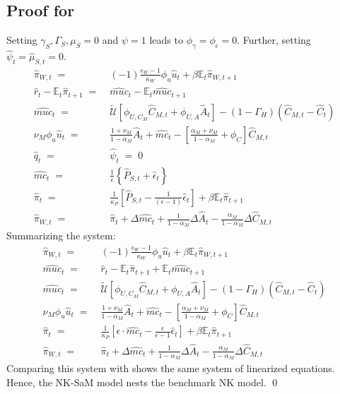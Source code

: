 \documentclass[12pt,3p,authoryear,review]{elsarticle}
\begin{document}
\subsection{Proof for }\label{proof:no_sam}%
\begin{small}%
    \noindent Setting $\gamma_S, \Gamma_S, \mu_S=0$ and $\psi = 1$ leads to $\phi_\gamma=\phi_\epsilon=0$. Further, setting $\hat{\psi}_t = \hat{\mu}_{S,t} = 0$.%
    \begin{align}%
        \hat{\pi}_{W,t} \; = & \; (-1)\frac{\epsilon_W-1}{\kappa_W} \phi_u \hat{u}_t + \beta \mathbb{E}_t \hat{\pi}_{W,t+1}\\%
        \hat{r}_t - \mathbb{E}_t \hat{\pi}_{t+1} \; = & \; \hat{muc}_t - \mathbb{E}_t \hat{muc}_{t+1}\\%
        \hat{muc}_t \; = & \; \tilde{\mathcal{U}} \left[ \phi_{U,C_M} \hat{C}_{M,t} + \phi_{U,A} \hat{A}_t \right] - \left(1-\Gamma_H\right)\left(\hat{C}_{M,t}-\hat{C}_t\right)\\%
        \nu_M \phi_u \hat{u}_t \; = & \; \frac{1+\nu_M}{1-\alpha_M} \hat{A}_t + \hat{mc}_t - \left[\frac{\alpha_M+\nu_M}{1-\alpha_M}+\phi_C\right] \hat{C}_{M,t}\\%
        \hat{q}_t \; = & \; \hat{\psi}_t \; = \; 0\\%
        \hat{mc}_t \; = & \; \frac{1}{\epsilon} \left\{ \hat{P}_{S,t} + \hat{\epsilon}_t \right\}\\%
        \hat{\pi}_t \; = & \; \frac{1}{\kappa_P} \left[ \hat{P}_{S,t} - \frac{1}{\left(\epsilon-1\right)} \hat{\epsilon}_t \right] + \beta \mathbb{E}_t \hat{\pi}_{t+1}\\%
        \hat{\pi}_{W,t} \; = & \; \hat{\pi}_t + \Delta\hat{mc}_t + \frac{1}{1-\alpha_M} \Delta \hat{A}_t - \frac{\alpha_M}{1-\alpha_M}\Delta\hat{C}_{M,t}%
    \end{align}%
    Summarizing the system:%
    \begin{align}%
        \hat{\pi}_{W,t} \; = & \; (-1)\frac{\epsilon_W-1}{\kappa_W} \phi_u \hat{u}_t + \beta \mathbb{E}_t \hat{\pi}_{W,t+1}\\%
        \hat{muc}_t \; = & \; \hat{r}_t - \mathbb{E}_t \hat{\pi}_{t+1} + \mathbb{E}_t \hat{muc}_{t+1}\\%
        \hat{muc}_t \; = & \; \tilde{\mathcal{U}} \left[ \phi_{U,C_M} \hat{C}_{M,t} + \phi_{U,A} \hat{A}_t \right] - \left(1-\Gamma_H\right)\left(\hat{C}_{M,t}-\hat{C}_t\right)\\%
        \nu_M \phi_u \hat{u}_t \; = & \; \frac{1+\nu_M}{1-\alpha_M} \hat{A}_t + \hat{mc}_t - \left[\frac{\alpha_M+\nu_M}{1-\alpha_M}+\phi_C\right] \hat{C}_{M,t}\\%
        \hat{\pi}_t \; = & \; \frac{1}{\kappa_P} \left[ \epsilon \cdot \hat{mc}_t - \frac{\epsilon}{\epsilon-1} \hat{\epsilon}_t \right] + \beta \mathbb{E}_t \hat{\pi}_{t+1}\\%
        \hat{\pi}_{W,t} \; = & \; \hat{\pi}_t + \Delta\hat{mc}_t + \frac{1}{1-\alpha_M} \Delta \hat{A}_t - \frac{\alpha_M}{1-\alpha_M}\Delta\hat{C}_{M,t}%
    \end{align}%
    Comparing this system with \cite{ercegOptimalMonetaryPolicy2000,gali2011unemployment} shows the same system of linearized equations. Hence, the NK-SaM model nests the benchmark NK model. \qed%
\end{small}%
\end{document}

